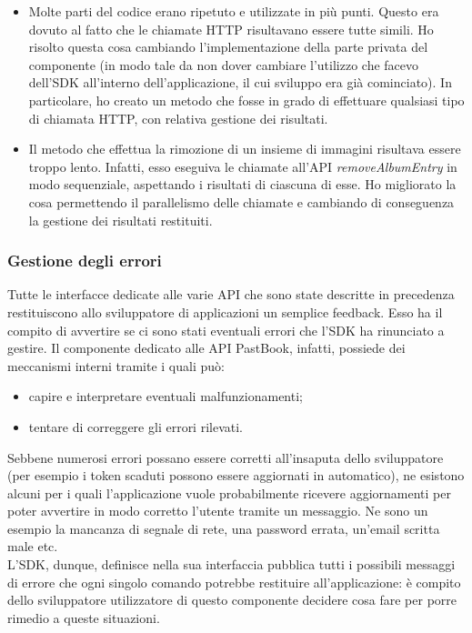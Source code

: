				\begin{itemize}
					\item Molte parti del codice erano ripetuto e utilizzate in più punti. Questo era dovuto al fatto che le
					chiamate HTTP risultavano essere tutte simili. Ho risolto questa cosa cambiando l'implementazione della parte
					privata del componente (in modo tale da non dover cambiare l'utilizzo che facevo dell'SDK all'interno
					dell'applicazione, il cui sviluppo era già cominciato). In particolare, ho creato un metodo che fosse in
					grado di effettuare qualsiasi tipo di chiamata HTTP, con relativa gestione dei risultati.
					\item Il metodo che effettua la rimozione di un insieme di immagini risultava essere troppo lento. Infatti,
					esso eseguiva le chiamate all'API \emph{removeAlbumEntry} in modo sequenziale, aspettando i risultati di
					ciascuna di esse. Ho migliorato la cosa permettendo il parallelismo delle chiamate e cambiando di conseguenza
					la gestione dei risultati restituiti.
				\end{itemize}
			\subsubsection{Gestione degli errori}
				Tutte le interfacce dedicate alle varie API che sono state descritte in precedenza restituiscono allo sviluppatore di
				applicazioni un semplice feedback. Esso ha il compito di avvertire se ci sono stati eventuali errori che l'SDK ha
				rinunciato a gestire. Il componente dedicato alle API PastBook, infatti, possiede dei meccanismi interni tramite i
				quali può:
				\begin{itemize} 
					\item capire e interpretare eventuali malfunzionamenti;
					\item tentare di correggere gli errori rilevati.
				\end{itemize}
				Sebbene numerosi errori possano essere corretti all'insaputa dello sviluppatore (per esempio i token scaduti possono
				essere aggiornati in automatico), ne esistono alcuni per i quali l'applicazione vuole probabilmente ricevere
				aggiornamenti per poter avvertire in modo corretto l'utente tramite un messaggio. Ne sono un esempio la mancanza di
				segnale di rete, una password errata, un'email scritta male etc.\\
				L'SDK, dunque, definisce nella sua interfaccia pubblica tutti i possibili messaggi di errore che ogni singolo comando
				potrebbe restituire all'applicazione: è compito dello sviluppatore utilizzatore di questo componente decidere cosa
				fare per porre rimedio a queste situazioni.
